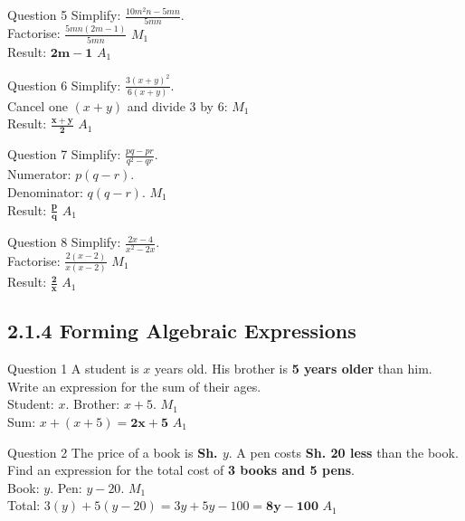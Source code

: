 \documentclass[12pt, a4paper, oneside]{article}
\begin{document}
\begin{solvingbox}{Question 5}
Simplify: $\frac{10m^2n - 5mn}{5mn}$. \\
Factorise: $\frac{5mn(2m - 1)}{5mn}$ \hfill $M_1$ \\
Result: $\mathbf{2m - 1}$ \hfill $A_1$
\end{solvingbox}

\begin{solvingbox}{Question 6}
Simplify: $\frac{3(x + y)^2}{6(x + y)}$. \\
Cancel one $(x + y)$ and divide 3 by 6: \hfill $M_1$ \\
Result: $\mathbf{\frac{x + y}{2}}$ \hfill $A_1$
\end{solvingbox}

\begin{solvingbox}{Question 7}
Simplify: $\frac{pq - pr}{q^2 - qr}$. \\
Numerator: $p(q - r)$. \\
Denominator: $q(q - r)$. \hfill $M_1$ \\
Result: $\mathbf{\frac{p}{q}}$ \hfill $A_1$
\end{solvingbox}

\begin{solvingbox}{Question 8}
Simplify: $\frac{2x - 4}{x^2 - 2x}$. \\
Factorise: $\frac{2(x - 2)}{x(x - 2)}$ \hfill $M_1$ \\
Result: $\mathbf{\frac{2}{x}}$ \hfill $A_1$
\end{solvingbox}

\subsection*{2.1.4 Forming Algebraic Expressions}

\begin{solvingbox}{Question 1}
A student is $x$ years old. His brother is \textbf{5 years older} than him. Write an expression for the sum of their ages. \\
Student: $x$. Brother: $x + 5$. \hfill $M_1$ \\
Sum: $x + (x + 5) = \mathbf{2x + 5}$ \hfill $A_1$
\end{solvingbox}

\begin{solvingbox}{Question 2}
The price of a book is \textbf{Sh. $y$}. A pen costs \textbf{Sh. 20 less} than the book. Find an expression for the total cost of \textbf{3 books and 5 pens}. \\
Book: $y$. Pen: $y - 20$. \hfill $M_1$ \\
Total: $3(y) + 5(y - 20) = 3y + 5y - 100 = \mathbf{8y - 100}$ \hfill $A_1$
\end{solvingbox}
\end{document}
